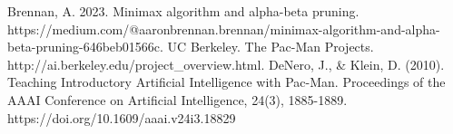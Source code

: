 \documentclass[letterpaper]{article} %
\begin{document}
\begin{thebibliography}{00}
	 Brennan, A. 2023. Minimax algorithm and alpha-beta pruning. https://medium.com/@aaronbrennan.brennan/minimax-algorithm-and-alpha-beta-pruning-646beb01566c. 
  UC Berkeley. The Pac-Man Projects. http://ai.berkeley.edu/project\_overview.html.
  DeNero, J., \& Klein, D. (2010). Teaching Introductory Artificial Intelligence with Pac-Man. Proceedings of the AAAI Conference on Artificial Intelligence, 24(3), 1885-1889. https://doi.org/10.1609/aaai.v24i3.18829
\end{thebibliography}
\end{document}
